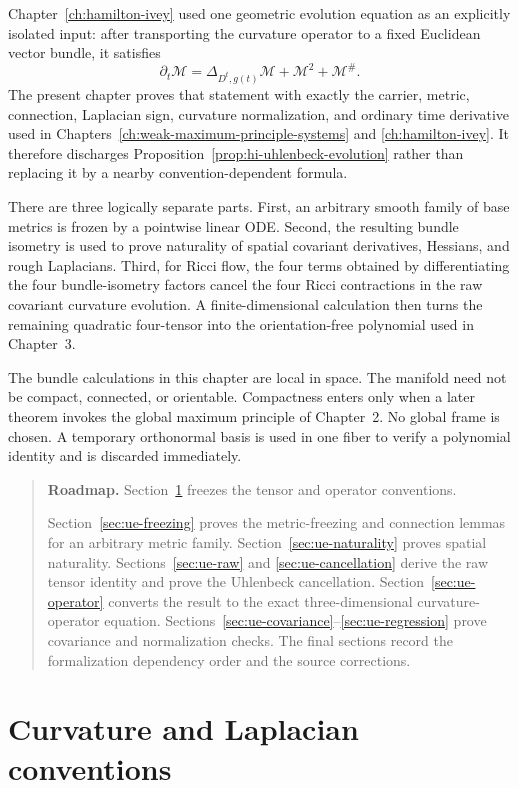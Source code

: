 \documentclass[10pt]{coll-l}
\newenvironment{roadmap}[1]{%
  \begin{quote}\small\noindent\textbf{Roadmap.} #1\par\medskip\noindent
}{\end{quote}}
\theoremstyle{definition}
\theoremstyle{remark}
\numberwithin{section}{chapter}
\numberwithin{equation}{chapter}
\begin{document}
Chapter~\ref{ch:hamilton-ivey} used one geometric evolution equation as an
explicitly isolated input: after transporting the curvature operator to a
fixed Euclidean vector bundle, it satisfies
\[
       \partial_t\mathcal M
          =\Delta_{D^t,g(t)}\mathcal M
             +\mathcal M^2+\mathcal M^\#.
\]
The present chapter proves that statement with exactly the carrier, metric,
connection, Laplacian sign, curvature normalization, and ordinary time
derivative used in Chapters~\ref{ch:weak-maximum-principle-systems} and
\ref{ch:hamilton-ivey}.  It therefore discharges
Proposition~\ref{prop:hi-uhlenbeck-evolution} rather than replacing it by a
nearby convention-dependent formula.

There are three logically separate parts.  First, an arbitrary smooth
family of base metrics is frozen by a pointwise linear ODE.  Second, the
resulting bundle isometry is used to prove naturality of spatial covariant
derivatives, Hessians, and rough Laplacians.  Third, for Ricci flow, the four
terms obtained by differentiating the four bundle-isometry factors cancel
the four Ricci contractions in the raw covariant curvature evolution.  A
finite-dimensional calculation then turns the remaining quadratic
four-tensor into the orientation-free polynomial used in Chapter~3.

The bundle calculations in this chapter are local in space.  The manifold
need not be compact, connected, or orientable.  Compactness enters only
when a later theorem invokes the global maximum principle of Chapter~2.
No global frame is chosen.  A temporary orthonormal basis is used in one
fiber to verify a polynomial identity and is discarded immediately.

\begin{roadmap}{Section~\ref{sec:ue-conventions} freezes the tensor and
operator conventions.}
Section~\ref{sec:ue-freezing} proves the metric-freezing and connection
lemmas for an arbitrary metric family.  Section~\ref{sec:ue-naturality}
proves spatial naturality.  Sections~\ref{sec:ue-raw} and
\ref{sec:ue-cancellation} derive the raw tensor identity and prove
the Uhlenbeck cancellation.  Section~\ref{sec:ue-operator} converts the
result to the exact three-dimensional curvature-operator equation.
Sections~\ref{sec:ue-covariance}--\ref{sec:ue-regression} prove covariance
and normalization checks.  The final sections record the formalization
dependency order and the source corrections.
\end{roadmap}

\section{Curvature and Laplacian conventions}
\label{sec:ue-conventions}
\end{document}
